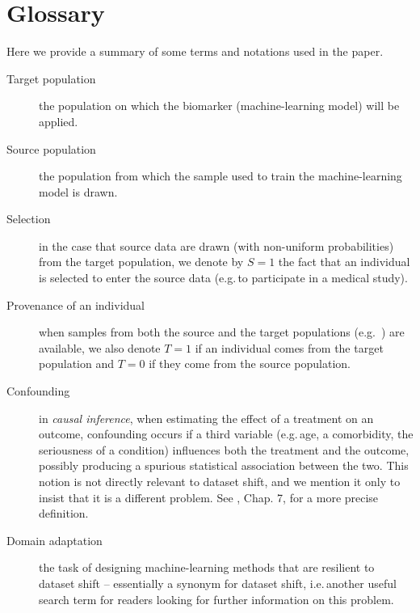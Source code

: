 \documentclass[twocolumn]{article}
\newcommand{\eg}{e.g.\,}
\newcommand{\ie}{i.e.\,}
\begin{document}
\section{Glossary}

Here we provide a summary of some terms and notations used in the paper.

\begin{description}
  \item [Target population] the population on which the biomarker
    (machine-learning model) will be applied.
  \item [Source population] the population from which the sample used to train
    the machine-learning model is drawn.
  \item [Selection] in the case that source data are drawn (with non-uniform
    probabilities) from the target population, we denote by $S = 1$ the fact
    that an individual is selected to enter the source data (\eg to participate
    in a medical study).
  \item [Provenance of an individual] when samples from
    both the source and the target populations (\eg
    ) are available, we also denote $T=1$ if an individual
    comes from the target population and $T=0$ if they come from the source
    population.
  \item [Confounding] in \emph{causal inference}, when estimating the effect of a treatment on an outcome, confounding occurs if a third variable (\eg age, a comorbidity, the seriousness of a condition) influences both the treatment and the outcome, possibly producing a spurious statistical association between the two.
    This notion is not directly relevant to dataset shift, and we mention it only to insist that it is a different problem.
    See \citet{hernan2020causal}, Chap. 7, for a more precise definition.
  \item [Domain adaptation] the task of designing machine-learning methods that are resilient to dataset shift -- essentially a synonym for dataset shift, \ie another useful search term for readers looking for further information on this problem.
\end{description}

\end{document}
